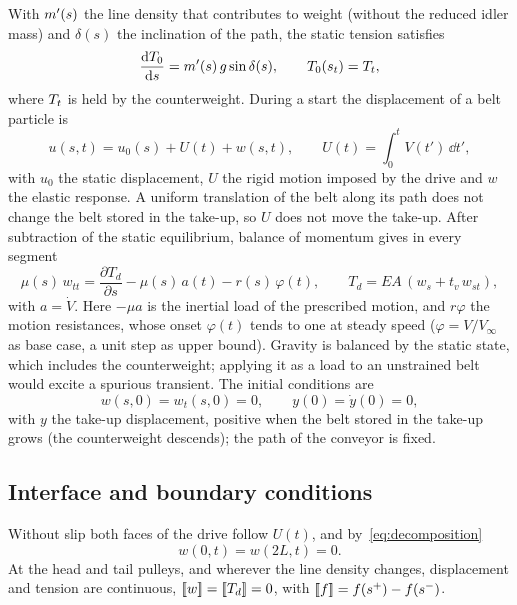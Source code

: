With $m'(s)$ the line density that contributes to weight (without the reduced idler mass)
and $\delta(s)$ the inclination of the path, the static tension satisfies
\begin{equation}\label{eq:static}
  \frac{\mathrm{d} T_0}{\mathrm{d} s}=m'(s)\,g\sin\delta(s),\qquad T_0(s_t)=T_t,
\end{equation}
where $T_t$ is held by the counterweight. During a start the displacement of a belt
particle is
\begin{equation}\label{eq:decomposition}
  u(s,t)=u_0(s)+U(t)+w(s,t),\qquad U(t)=\int_0^tV(t')\,\dd t',
\end{equation}
with $u_0$ the static displacement, $U$ the rigid motion imposed by the drive and $w$ the
elastic response. A uniform translation of the belt along its path does not change the
belt stored in the take-up, so $U$ does not move the take-up. After subtraction of the
static equilibrium, balance of momentum gives in every segment
\begin{equation}\label{eq:pde}
  \mu(s)\,w_{tt}=\frac{\partial T_d}{\partial s}-\mu(s)\,a(t)-r(s)\,\varphi(t),
  \qquad T_d=EA\,(w_s+t_v\,w_{st}),
\end{equation}
with $a=\dot V$. Here $-\mu a$ is the inertial load of the prescribed motion, and $r\varphi$ the
motion resistances, whose onset $\varphi(t)$ tends to one at steady speed ($\varphi=V/V_\infty$
as base case, a unit step as upper bound). Gravity is balanced by the static state, which
includes the counterweight; applying it as a load to an unstrained belt would excite a spurious
transient. The initial conditions are
\begin{equation}\label{eq:ic}
  w(s,0)=w_t(s,0)=0,\qquad y(0)=\dot y(0)=0,
\end{equation}
with $y$ the take-up displacement, positive when the belt stored in the take-up grows
(the counterweight descends); the path of the conveyor is fixed.

\subsection{Interface and boundary conditions}\label{sec:interfaces}

Without slip both faces of the drive follow $U(t)$, and by~\eqref{eq:decomposition}
\begin{equation}\label{eq:bc_drive}
  w(0,t)=w(2L,t)=0.
\end{equation}
At the head and tail pulleys, and wherever the line density changes, displacement and
tension are continuous, $[\![w]\!]=[\![T_d]\!]=0$, with $[\![f]\!]=f(s^+)-f(s^-)$.

